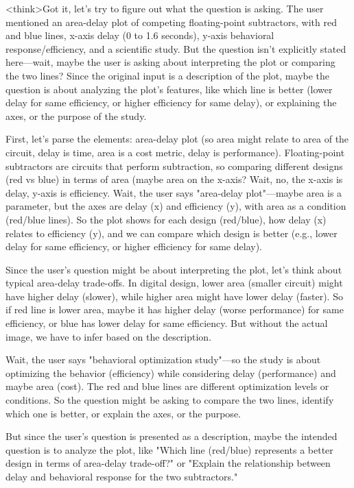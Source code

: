 <think>Got it, let's try to figure out what the question is asking. The user mentioned an area-delay plot of competing floating-point subtractors, with red and blue lines, x-axis delay (0 to 1.6 seconds), y-axis behavioral response/efficiency, and a scientific study. But the question isn't explicitly stated here—wait, maybe the user is asking about interpreting the plot or comparing the two lines? Since the original input is a description of the plot, maybe the question is about analyzing the plot's features, like which line is better (lower delay for same efficiency, or higher efficiency for same delay), or explaining the axes, or the purpose of the study.

First, let's parse the elements: area-delay plot (so area might relate to area of the circuit, delay is time, area is a cost metric, delay is performance). Floating-point subtractors are circuits that perform subtraction, so comparing different designs (red vs blue) in terms of area (maybe area on the x-axis? Wait, no, the x-axis is delay, y-axis is efficiency. Wait, the user says "area-delay plot"—maybe area is a parameter, but the axes are delay (x) and efficiency (y), with area as a condition (red/blue lines). So the plot shows for each design (red/blue), how delay (x) relates to efficiency (y), and we can compare which design is better (e.g., lower delay for same efficiency, or higher efficiency for same delay).

Since the user's question might be about interpreting the plot, let's think about typical area-delay trade-offs. In digital design, lower area (smaller circuit) might have higher delay (slower), while higher area might have lower delay (faster). So if red line is lower area, maybe it has higher delay (worse performance) for same efficiency, or blue has lower delay for same efficiency. But without the actual image, we have to infer based on the description.

Wait, the user says "behavioral optimization study"—so the study is about optimizing the behavior (efficiency) while considering delay (performance) and maybe area (cost). The red and blue lines are different optimization levels or conditions. So the question might be asking to compare the two lines, identify which one is better, or explain the axes, or the purpose.

But since the user's question is presented as a description, maybe the intended question is to analyze the plot, like "Which line (red/blue) represents a better design in terms of area-delay trade-off?" or "Explain the relationship between delay and behavioral response for the two subtractors."

